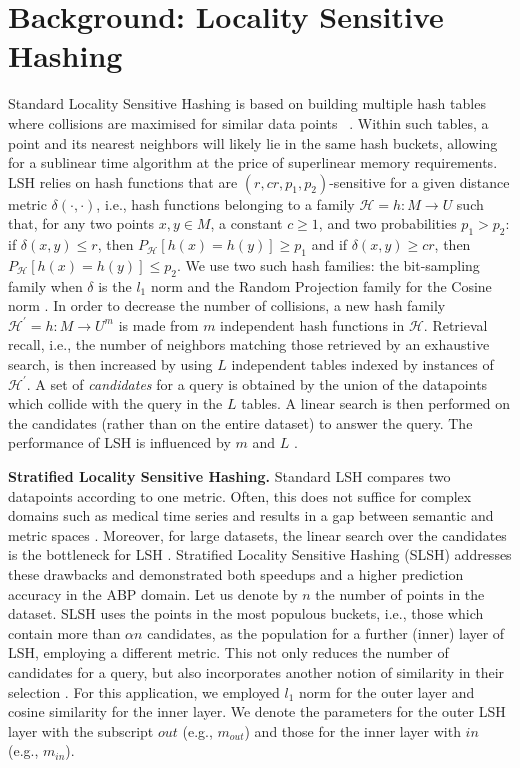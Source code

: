 \documentclass{article}
\begin{document}
\section{Background: Locality Sensitive Hashing}
\label{background}
Standard Locality Sensitive Hashing is based on building multiple
 hash tables where collisions are maximised for similar data points~ \cite{IM98}. Within such tables, a point and its nearest neighbors will likely lie in the same hash buckets, allowing for a sublinear time algorithm at the price of superlinear memory requirements.
LSH relies on hash functions that are $(r, cr, p_1, p_2)$-sensitive \cite{IM98} for a given distance metric $\delta(\cdot,\cdot)$, i.e., hash functions belonging to a family $\mathcal{H}={h:M\rightarrow U}$ such that, for any two points $x,y \in M$, a constant $c\geq1$, and two probabilities $p_1 > p_2$: if $\delta(x, y) \leq r$, then $P_{\mathcal{H}}[h(x)=h(y)] \geq p_1$ and if $\delta(x, y) \geq cr$, then $P_{\mathcal{H}}[h(x)=h(y)] \leq p_2$. We use two such hash families: the bit-sampling family when $\delta$ is the $l_1$ norm \cite{GIM99} and the Random Projection family for the Cosine norm \cite{Charikar}.
In order to decrease the number of collisions, a new hash family $\mathcal{H^\prime}={h:M\rightarrow U^m}$ is made from $m$ independent hash functions in $\mathcal{H}$.
Retrieval recall, i.e., the number of neighbors matching those retrieved by an exhaustive search, is then increased by using $L$ independent tables indexed by instances of $\mathcal{H^\prime}$.
A set of \emph{candidates} for a query is obtained by the union of the datapoints which collide with the query in the $L$ tables. A linear search is then performed on the candidates (rather than on the entire dataset) to answer the query.
The performance of LSH is influenced by $m$ and $L$ \cite{Dong2008}.

\textbf{Stratified Locality Sensitive Hashing.}
Standard LSH compares two datapoints according to one metric. Often, this does not suffice for complex domains such as medical time series and results in a gap between semantic and metric spaces \cite{SLSHretrieval}.
Moreover, for large datasets, the linear search over the candidates is the bottleneck for LSH \cite{LSHcomparison}.
Stratified Locality Sensitive Hashing (SLSH)\cite{SLSHretrieval} addresses these drawbacks and demonstrated both speedups and a higher prediction accuracy in the ABP domain. 
Let us denote by $n$ the number of points in the dataset. SLSH uses the points in the most populous buckets, i.e., those which contain more than $\alpha n$ candidates, as the population for a further (inner) layer of LSH, employing a different metric. This not only reduces the number of candidates for a query, but also incorporates another notion of similarity in their selection \cite{SLSHretrieval}.
For this application, we employed $l_1$ norm for the outer layer and cosine similarity for the inner layer. We denote the parameters for the outer LSH layer with the subscript $out$ (e.g., $m_{out}$) and those for the inner layer with $in$ (e.g., $m_{in}$).
\end{document}
